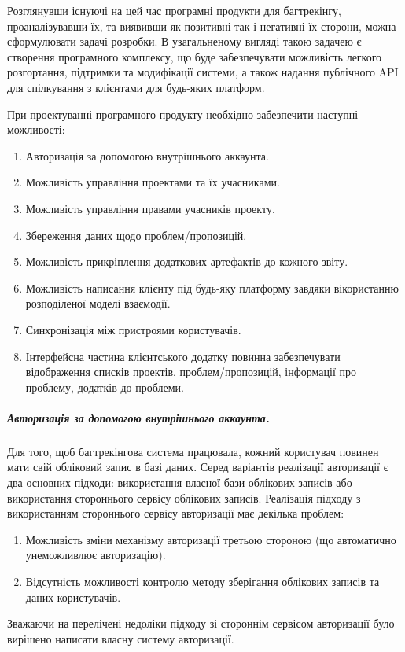 \documentclass[../main.tex]{subfiles}
\begin{document}
	Розглянувши існуючі на цей час програмні продукти для багтрекінгу, проаналізувавши їх, та виявивши як позитивні так і негативні їх сторони, можна сформулювати задачі розробки. В узагальненому вигляді такою задачею є створення програмного комплексу, що буде забезпечувати можливість легкого розгортання, підтримки та модифікації системи, а також надання публічного API для спілкування з клієнтами для будь-яких платформ.
	
	При проектуванні програмного продукту необхідно забезпечити наступні можливості:
	\begin{enumerate}
	  \item Авторизація за допомогою внутрішнього аккаунта.
	  \item Можливість управління проектами та їх учасниками.
	  \item Можливість управління правами учасників проекту.
	  \item Збереження даних щодо проблем/пропозицій.
	  \item Можливість прикріплення додаткових артефактів до кожного звіту.
	  \item Можливість написання клієнту під будь-яку платформу завдяки вікористанню розподіленої моделі взаємодії.
	  \item Синхронізація між пристроями користувачів.
	  \item Інтерфейсна частина клієнтського додатку повинна забезпечувати відображення списків проектів, проблем/пропозицій, інформації про проблему, додатків до проблеми.
	\end{enumerate}
	
	\subparagraph{Авторизація за допомогою внутрішнього аккаунта.}
		Для того, щоб багтрекінгова система працювала, кожний користувач повинен мати свій обліковий запис в базі даних. Серед варіантів реалізації авторизації є два основних підходи: використання власної бази облікових записів або використання стороннього сервісу облікових записів. Реалізація підходу з використанням стороннього сервісу авторизації має декілька проблем:
		\begin{enumerate}
			\item Можливість зміни механізму авторизації третьою стороною (що автоматично унеможливлює авторизацію).
			\item Відсутність можливості контролю методу зберігання облікових записів та даних користувачів.
		\end{enumerate}
		
		Зважаючи на перелічені недоліки підходу зі стороннім сервісом авторизації було вирішено написати власну систему авторизації.
	
\end{document}
